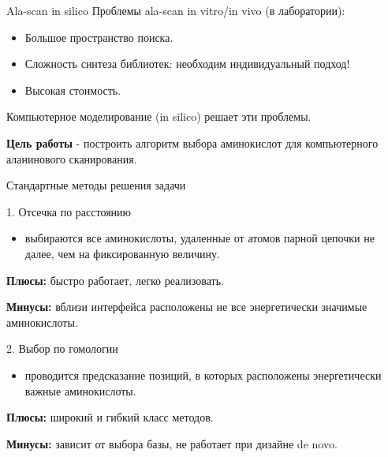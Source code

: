 \documentclass[12pt, xcolor={dvipsnames}]{beamer}
\begin{document}
\begin{frame}{Ala-scan in silico}
Проблемы ala-scan in vitro/in vivo (в лаборатории):
\begin{itemize}
\item Большое пространство поиска.
\item Сложность синтеза библиотек: необходим индивидуальный подход!
\item Высокая стоимость.
\end{itemize}
Компьютерное моделирование (in silico)  решает эти проблемы. %

\textbf{Цель работы }- построить алгоритм выбора аминокислот для компьютерного аланинового сканирования.
\end{frame}
\begin{frame}{Стандартные методы решения задачи}
\begin{block}{1. Отсечка по расстоянию}
\begin{itemize}
\item выбираются все аминокислоты,
удаленные от атомов парной цепочки не далее, чем на фиксированную величину.
\end{itemize}

\textbf{Плюсы:} быстро работает, легко реализовать.

\textbf{Минусы:} вблизи интерфейса расположены не все энергетически значимые аминокислоты.
\end{block}
\begin{block}{2. Выбор по гомологии}
\begin{itemize}
\item проводится предсказание позиций, в которых расположены энергетически важные аминокислоты.
\end{itemize}
\textbf{Плюсы:} широкий и гибкий класс методов.

\textbf{Минусы:} зависит от выбора базы, не  работает при дизайне de novo.
\end{block}
\end{frame}
\end{document}
